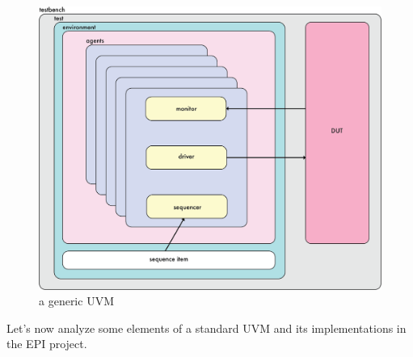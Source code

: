 \begin{figure}[H]
    \centering
    \includegraphics[scale = 0.4]{Chapter_1/img/general-uvm.png}
    \caption{a generic UVM}
    \label{gen-uvm}
\end{figure}

Let's now analyze some elements of a standard UVM and its implementations in the EPI project.

